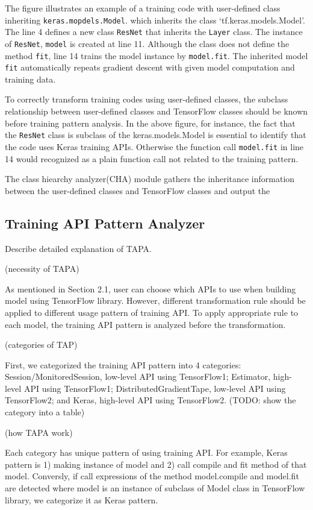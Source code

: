 

The figure illustrates an example of a training code with
user-defined class inheriting {\tt keras.mopdels.Model}.
which inherits the class `tf.keras.models.Model'.
The line 4 defines a new class {\tt ResNet} that inherits the  
{\tt Layer} class. The instance of {\tt ResNet}, {\tt model}
is created at line 11. Although the class does not define
the method {\tt fit}, line 14 trains the model instance by
{\tt model.fit}. The inherited model {\tt fit}
automatically repeats gradient descent with
given model computation and training data. 

To correctly transform training codes using user-defined classes,
the subclass relationship between user-defined classes
and TensorFlow classes should be known before training pattern analysis. 
In the above figure, for instance, the fact that the {\tt ResNet} class
is subclass of the {keras.models.Model} is essential to identify
that the code uses Keras training APIs. 
Otherwise the function call {\tt model.fit} in line 14 would
recognized as a plain function call not related to the training pattern.

The class hiearchy analyzer(CHA) module gathers the
inheritance information between the user-defined classes and TensorFlow classes
and output the 

\subsection{Training API Pattern Analyzer}
Describe detailed explanation of TAPA.

(necessity of TAPA)

As mentioned in Section 2.1, user can choose which APIs to use
when building model using TensorFlow library.
However, different transformation rule should be applied
to different usage pattern of training API.
To apply appropriate rule to each model,
the training API pattern is analyzed before the transformation.

(categories of TAP)

First, we categorized the training API pattern into 4 categories:
Session/MonitoredSession, low-level API using TensorFlow1;
Estimator, high-level API using TensorFlow1;
DistributedGradientTape, low-level API using TensorFlow2;
and Keras, high-level API using TensorFlow2.
(TODO: show the category into a table)

(how TAPA work)

Each category has unique pattern of using training API.
For example, Keras pattern is 1) making instance of model and
2) call compile and fit method of that model.
Conversly, if call expressions of the method model.compile and model.fit are detected
where model is an instance of subclass of Model class in TensorFlow library,
we categorize it as Keras pattern.

